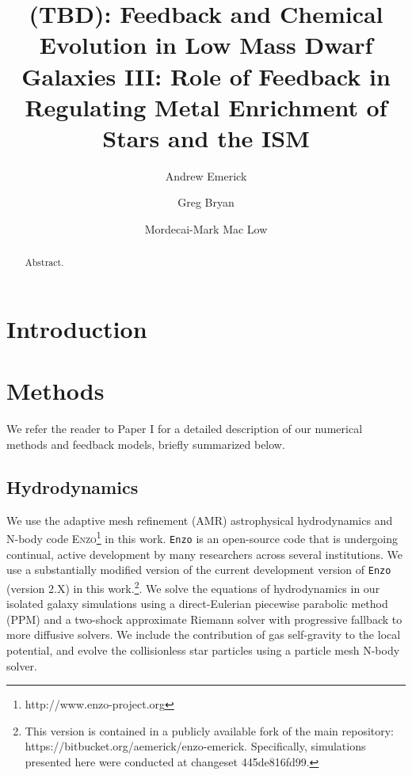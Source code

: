 \documentclass[twocolumn]{aastex61}
\begin{document}
\title{(TBD): Feedback and Chemical Evolution in Low Mass Dwarf Galaxies III: Role of Feedback in Regulating Metal Enrichment of Stars and the ISM}


\author{Andrew Emerick}
\author{Greg Bryan}
\author{Mordecai-Mark Mac Low}

\begin{abstract}
Abstract.
\end{abstract}

\keywords{}

\section{Introduction}


\section{Methods}
\label{sec:methods}
We refer the reader to Paper I for a detailed description of our numerical methods and feedback models, briefly summarized below.

\subsection{Hydrodynamics}
We use the adaptive mesh refinement (AMR) astrophysical hydrodynamics and N-body code \textsc{Enzo}\footnote{http://www.enzo-project.org} \citep{Enzo2014} in this work. \texttt{Enzo} is an open-source code that is undergoing continual, active development by many researchers across several institutions. We use a substantially modified version of the current development version of \texttt{Enzo} (version 2.X) in this work.\footnote{This version is contained in a publicly available fork of the main repository: https://bitbucket.org/aemerick/enzo-emerick. Specifically, simulations presented here were conducted at changeset 445de816fd99.}. We solve the equations of hydrodynamics in our isolated galaxy simulations using a direct-Eulerian piecewise parabolic method (PPM) \citep{ColellaWoodward1984, Bryan1995} and a two-shock approximate Riemann solver with progressive fallback to more diffusive solvers. We include the contribution of gas self-gravity to the local potential, and evolve the collisionless star particles using a particle mesh N-body solver.
\end{document}
